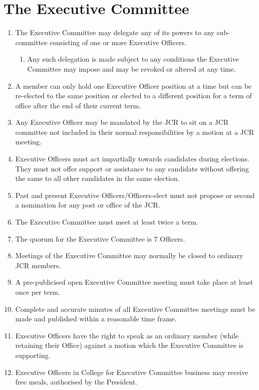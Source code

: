 \documentclass[12pt]{article}  %
\begin{document}
\section{The Executive Committee}
\begin{enumerate}
    \item The Executive Committee may delegate any of its powers to any sub-committee consisting of one or more Executive Officers.
    \begin{enumerate}
        \item Any such delegation is made subject to any conditions the Executive Committee may impose and may be revoked or altered at any time.
    \end{enumerate}
    \item A member can only hold one Executive Officer position at a time but can be re-elected to the same position or elected to a different position for a term of office after the end of their current term.
    \item Any Executive Officer may be mandated by the JCR to sit on a JCR committee not included in their normal responsibilities by a motion at a JCR meeting.
    \item Executive Officers must act impartially towards candidates during elections. They must not offer support or assistance to any candidate without offering the same to all other candidates in the same election.
    \item Past and present Executive Officers/Officers-elect must not propose or second a nomination for any post or office of the JCR.
    \item The Executive Committee must meet at least twice a term.
    \item The quorum for the Executive Committee is 7 Officers.
    \item Meetings of the Executive Committee may normally be closed to ordinary JCR members.
    \item A pre-publicised open Executive Committee meeting must take place at least once per term.
    \item Complete and accurate minutes of all Executive Committee meetings must be made and published within a reasonable time frame.
    \item Executive Officers have the right to speak as an ordinary member (while retaining their Office) against a motion which the Executive Committee is supporting.
    \item Executive Officers in College for Executive Committee business may receive free meals, authorised by the President.
\end{enumerate}
\newpage
\end{document}
